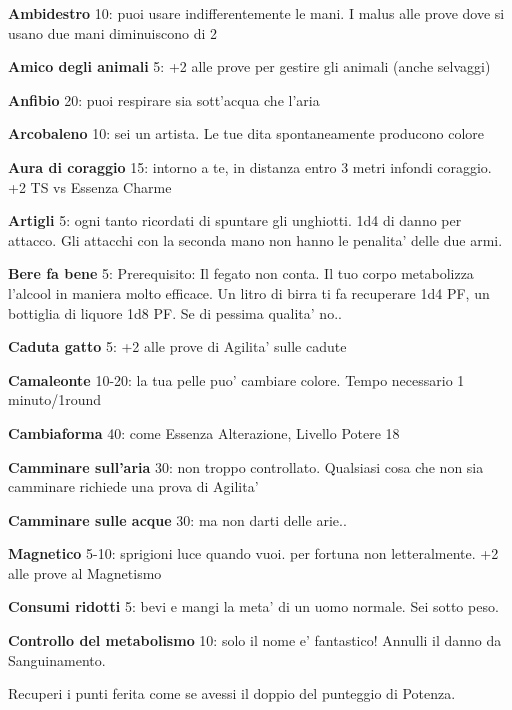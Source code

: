 \documentclass[a4paper,11pt,twoside,openany]{book}
\begin{document}
	\textbf{Ambidestro}\label{Ambidestro} 10: puoi usare indifferentemente le mani. I malus alle prove dove si usano due mani diminuiscono di 2
	
	\textbf{Amico degli animali} 5: +2 alle prove per gestire gli animali (anche selvaggi)
	
	\textbf{Anfibio} 20: puoi respirare sia sott'acqua che l'aria
	
	\textbf{Arcobaleno} 10: sei un artista. Le tue dita spontaneamente
	producono colore
	
	\textbf{Aura di coraggio} 15: intorno a te, in distanza entro 3 metri infondi coraggio. +2 TS vs Essenza Charme
	
	\textbf{Artigli} 5: ogni tanto ricordati di spuntare gli unghiotti. 1d4 di danno per attacco. Gli attacchi con la seconda mano non hanno le penalita' delle due armi.
	
	\textbf{Bere fa bene} 5: Prerequisito: Il fegato non conta. Il tuo corpo metabolizza l'alcool in maniera molto efficace. Un litro di birra ti fa recuperare 1d4 PF, un bottiglia di liquore 1d8 PF. Se di pessima qualita' no.. 
	
	\textbf{Caduta gatto} 5: +2 alle prove di Agilita' sulle cadute
	
	\textbf{Camaleonte} 10-20: la tua pelle puo' cambiare colore. Tempo necessario 1 minuto/1round
	
	\textbf{Cambiaforma} 40: come Essenza Alterazione, Livello Potere 18
	
	\textbf{Camminare sull'aria} 30: non troppo controllato. Qualsiasi cosa che non sia camminare richiede una prova di Agilita'
	
	\textbf{Camminare sulle acque}  30: ma non darti delle arie..
	
	\textbf{Magnetico} 5-10: sprigioni luce quando vuoi. per fortuna non letteralmente. +2 alle prove al Magnetismo
	
	\textbf{Consumi ridotti} 5: bevi e mangi la meta' di un uomo normale. Sei sotto peso.
	
	\textbf{Controllo del metabolismo}  10: solo il nome e' fantastico! Annulli il danno da Sanguinamento.
	
	Recuperi i punti ferita come se avessi il doppio del punteggio di Potenza.
	
\end{document}
